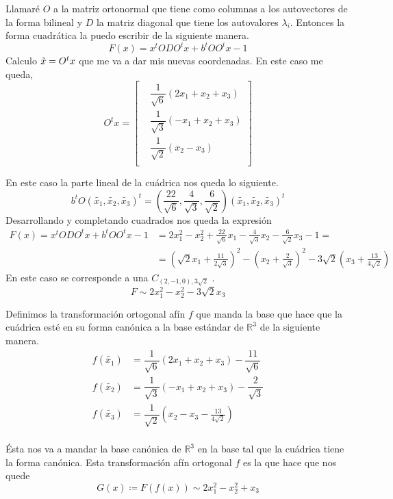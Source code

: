 Llamaré $O$ a la matriz ortonormal que tiene como columnas a los autovectores de la forma bilineal y $D$ la matriz diagonal que tiene los autovalores $\lambda_i$. Entonces la forma cuadrática la puedo escribir de la siguiente manera.
\begin{equation}
\label{formula}
 F(x) = x^{t}ODO^{t}x + b^{t}OO^{t}x -1 
 \end{equation}
Calculo $\tilde x = O^{t}x$ que me va a dar mis nuevas coordenadas. En este caso me queda,
\[
O^tx = 
\begin{bmatrix}
&\dfrac{1}{\sqrt{6}}\left( 2x_1 + x_2 + x_3\right)  \\
&\dfrac{1}{\sqrt{3}}\left( -x_1 + x_2 + x_3 \right)  \\
&\dfrac{1}{\sqrt{2}} \left( x_2 - x_3\right)  \\
\end{bmatrix}
\]




En este caso  la parte lineal de la cuádrica nos queda lo siguiente.
\[b^tO(\tilde{x_1},\tilde{x_2},\tilde{x_3})^t = \left( \dfrac{22}{\sqrt{6}},\dfrac{4}{\sqrt{3}},\dfrac{6}{\sqrt{2}}\right)(\tilde{x_1},\tilde{x_2},\tilde{x_3})^t \]
Desarrollando y completando cuadrados nos queda la expresión
\begin{align*}
F(x) = x^{t}ODO^{t}x + b^{t}OO^{t}x -1 &= 2x_1^2 - x_2^2 + \frac{22}{\sqrt{6}}x_1 - \frac{4}{\sqrt{3}}x_2 - \frac{6}{\sqrt{2}}x_3 - 1 = \\
 &= (\sqrt{2}x_1 + \frac{11}{2\sqrt{3}})^2 -(x_2 + \frac{2}{\sqrt{3}})^2 -3\sqrt{2}(x_3 + \frac{13}{4\sqrt{2}})
\end{align*}
  En este caso se corresponde a una $C_{(2,-1,0), 3\sqrt2}$ .
 \[ F \sim 2x_1 ^2 -  x_2 ^2 - 3\sqrt2 x_3 \]
 
 Definimos la transformación ortogonal afín $f$ que manda la base que hace que la cuádrica esté en su forma canónica a la base estándar de $\mathbb R ^3$
 de la siguiente manera.
  \begin{align*}
   f\left( \tilde{x_1} \right) &= \dfrac{1}{\sqrt{6}}\left( 2x_1 + x_2 + x_3\right) - \dfrac{11}{\sqrt{6}}  \\
   f\left( \tilde{x_2} \right) &= \dfrac{1}{\sqrt{3}}\left( -x_1 + x_2 + x_3\right) - \dfrac{2}{\sqrt{3}}  \\
   f\left( \tilde{x_3} \right)  &= \dfrac{1}{\sqrt{2}} \left( x_2 - x_3 - \frac{13}{4\sqrt{2}} \right)  \\
 \end{align*}

 Ésta nos va a mandar la base canónica de $\mathbb R ^3$ en la base tal que la cuádrica tiene la forma canónica. Esta transformación afín ortogonal $f$ es la que hace que nos quede 
\[ G(x) \coloneqq F(f(x)) \sim 2x_1 ^2 -  x_2 ^2 + x_3 \]



